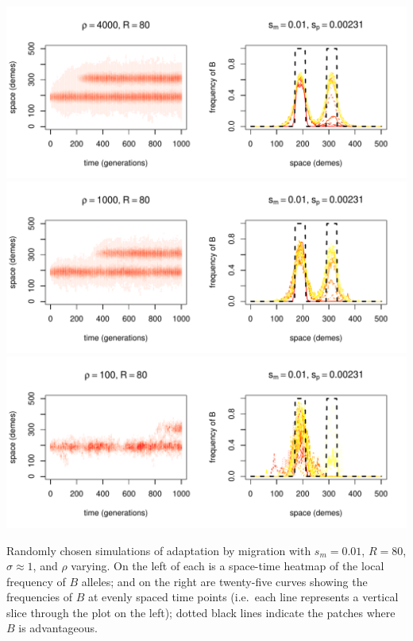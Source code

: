 \documentclass{article}
\begin{document}
\begin{sfigure}
  \begin{center}
    \includegraphics{example-migration-sims/42080-r1-501-sb0_01-sm-0_01-N4000-pophistory-run}
    \includegraphics{example-migration-sims/82698-r1-501-sb0_01-sm-0_01-N1000-pophistory-run}
    \includegraphics{example-migration-sims/97545-r1-501-sb0_01-sm-0_01-N100-pophistory-run}
  \end{center}
  \caption{
    Randomly chosen simulations of adaptation by migration
    with $s_m=0.01$, $R=80$, $\sigma\approx 1$, and $\rho$ varying.
    On the left of each is a space-time heatmap of the local frequency of $B$ alleles;
    and on the right are twenty-five curves showing the frequencies of $B$ at evenly spaced time points
    (i.e.\ each line represents a vertical slice through the plot on the left);
    dotted black lines indicate the patches where $B$ is advantageous.
  } \label{sfig:sims_6}
\end{sfigure}
\end{document}
